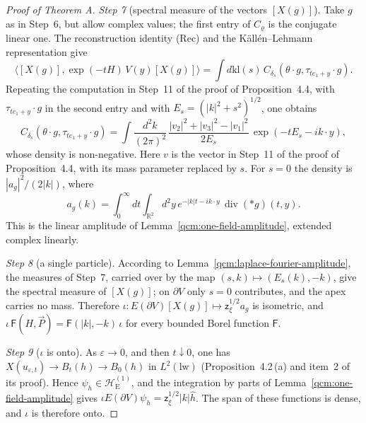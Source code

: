 \documentclass[11pt,letterpaper,reqno]{amsart}
\theoremstyle{definition}
\begin{document}
\begin{proof}[Proof of Theorem A]
\emph{Step 7} (spectral measure of the vectors $[X(g)]$).
Take $g$ as in Step~6, but allow complex values;
the first entry of $C_\varrho$ is the conjugate linear one.
The reconstruction identity (Rec) and the K\"all\'en--Lehmann representation give
\begin{equation*}
\bigl\langle[X(g)],\exp(-tH)\,V(y)[X(g)]\bigr\rangle=\int d\mathrm{kl}(s)\,C_{\delta_s}(\theta\cdot g,\tau_{te_1+y}\cdot g).
\end{equation*}
Repeating the computation in Step~11 of the proof of Proposition~4.4, with $\tau_{te_1+y}\cdot g$ in the second entry and with $E_s=(|k|^2+s^2)^{1/2}$, one obtains
\begin{equation*}
C_{\delta_s}(\theta\cdot g,\tau_{te_1+y}\cdot g)=\int\frac{d^2k}{(2\pi)^2}\,\frac{|v_2|^2+|v_3|^2-|v_1|^2}{2E_s}\,\exp(-tE_s-ik\cdot y),
\end{equation*}
whose density is non-negative.
Here $v$ is the vector in Step~11 of the proof of Proposition~4.4, with its mass parameter replaced by $s$.
For $s=0$ the density is $|a_g|^2/(2|k|)$, where
\[
a_g(k)=\int_0^\infty dt\int_{\mathbb R^2}d^2y\,
e^{-|k|t-ik\cdot y}\,\operatorname{div}(\ast g)(t,y).
\]
This is the linear amplitude of Lemma~\ref{qcm:one-field-amplitude}, extended complex linearly.

\emph{Step 8} (a single particle).
According to Lemma~\ref{qcm:laplace-fourier-amplitude}, the measures of Step~7, carried over by the map $(s,k)\mapsto(E_s(k),-k)$, give the spectral measure of $[X(g)]$;
on $\partial V$ only $s=0$ contributes, and the apex carries no mass.
Therefore $\iota\colon E(\partial V)[X(g)]\mapsto\mathsf z_\xi^{1/2}a_g$ is isometric, and $\iota\,\mathsf F(H,\vec P)=\mathsf F(|k|,-k)\,\iota$ for every bounded Borel function $\mathsf F$.

\emph{Step 9} ($\iota$ is onto).
As $\varepsilon\to0$, and then $t\downarrow0$, one has $X(u_{\varepsilon,t})\to B_t(h)\to B_0(h)$ in $L^2(\mathrm{lw})$ (Proposition~4.2\,(a) and item~2 of its proof).
Hence $\psi_h\in\mathcal H_{\mathrm E}^{(1)}$, and the integration by parts of Lemma~\ref{qcm:one-field-amplitude} gives $\iota E(\partial V)\psi_h=\mathsf z_\xi^{1/2}|k|\hat h$.
The span of these functions is dense, and $\iota$ is therefore onto.


\end{proof}
\end{document}
